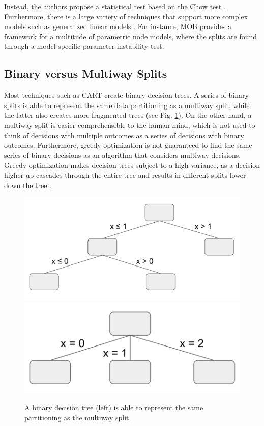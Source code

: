 \documentclass[a4paper, 11pt]{article}
\begin{document}
Instead, the authors propose a statistical test based on the Chow test \cite{chow_inequality_test}. Furthermore, there is a large variety of techniques that support more complex models such as generalized linear models \cite{ciampi_glm_tree, loh_guide, gama_functional_tree, zeileis_mob}. For instance, MOB provides a framework for a multitude of parametric node models, where the splits are found through a model-specific parameter instability test.

\subsection{Binary versus Multiway Splits}

Most techniques such as CART create binary decision trees. A series of binary splits is able to represent the same data partitioning as a multiway split, while the latter also creates more fragmented trees  \cite{hastie_elemstatlearn} (see Fig. \ref{fig:binary_vs_multiway}). On the other hand, a multiway split is easier comprehensible to the human mind, which is not used to think of decisions with multiple outcomes as a series of decisions with binary outcomes. Furthermore, greedy optimization is not guaranteed to find the same series of binary decisions as an algorithm that considers multiway decisions. Greedy optimization makes decision trees subject to a high variance, as a decision higher up cascades through the entire tree and results in different splits lower down the tree \cite{hastie_elemstatlearn}.
\begin{figure}
    \centering
    \includegraphics[width = 0.59\linewidth]{thesis/figure/binary_splits.png}
    \includegraphics[width = 0.4\linewidth]{thesis/figure/threeway_split.png}
    \caption{A binary decision tree (left) is able to represent the same partitioning as the multiway split.}
    \label{fig:binary_vs_multiway}
\end{figure}
\end{document}
